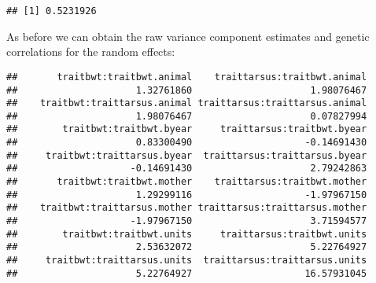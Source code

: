 \documentclass[12pt,]{book}
\newenvironment{Shaded}{\begin{snugshade}}{\end{snugshade}}
\newcommand{\DataTypeTok}[1]{\textcolor[rgb]{0.13,0.29,0.53}{#1}}
\newcommand{\DecValTok}[1]{\textcolor[rgb]{0.00,0.00,0.81}{#1}}
\newcommand{\FloatTok}[1]{\textcolor[rgb]{0.00,0.00,0.81}{#1}}
\newcommand{\KeywordTok}[1]{\textcolor[rgb]{0.13,0.29,0.53}{\textbf{#1}}}
\newcommand{\NormalTok}[1]{#1}
\newcommand{\OperatorTok}[1]{\textcolor[rgb]{0.81,0.36,0.00}{\textbf{#1}}}
\newcommand{\StringTok}[1]{\textcolor[rgb]{0.31,0.60,0.02}{#1}}
\begin{document}
\begin{Shaded}
\end{Shaded}

\begin{verbatim}
## [1] 0.5231926
\end{verbatim}

As before we can obtain the raw variance component estimates and genetic correlations for the random effects:

\begin{Shaded}
\end{Shaded}

\begin{verbatim}
##       traitbwt:traitbwt.animal    traittarsus:traitbwt.animal 
##                     1.32761860                     1.98076467 
##    traitbwt:traittarsus.animal traittarsus:traittarsus.animal 
##                     1.98076467                     0.07827994 
##        traitbwt:traitbwt.byear     traittarsus:traitbwt.byear 
##                     0.83300490                    -0.14691430 
##     traitbwt:traittarsus.byear  traittarsus:traittarsus.byear 
##                    -0.14691430                     2.79242863 
##       traitbwt:traitbwt.mother    traittarsus:traitbwt.mother 
##                     1.29299116                    -1.97967150 
##    traitbwt:traittarsus.mother traittarsus:traittarsus.mother 
##                    -1.97967150                     3.71594577 
##        traitbwt:traitbwt.units     traittarsus:traitbwt.units 
##                     2.53632072                     5.22764927 
##     traitbwt:traittarsus.units  traittarsus:traittarsus.units 
##                     5.22764927                    16.57931045
\end{verbatim}
\end{document}
